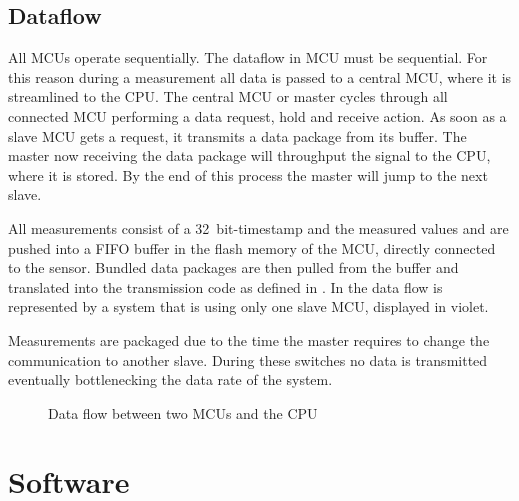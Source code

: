 



\subsection{Dataflow}

All \acs{MCU}s operate sequentially.
The dataflow in \ac{MCU} must be sequential. For this reason during a measurement all data is passed to a central \ac{MCU}, where it is streamlined to the \ac{CPU}. The central \ac{MCU} or master cycles through all connected \ac{MCU} performing a data request, hold and receive action. As soon as a slave \ac{MCU} gets a request, it transmits a data package from its buffer. The master now receiving the data package will throughput the signal to the \ac{CPU}, where it is stored. By the end of this process the master will jump to the next slave.

All measurements consist of a \SI{32}{bit}-timestamp and the measured values and are pushed into a \ac{FIFO} buffer in the flash memory of the \ac{MCU}, directly connected to the sensor. Bundled data packages are then pulled from the buffer and translated into the transmission code as defined in . In  the data flow is represented by a system that is using only one slave \ac{MCU}, displayed in violet.

Measurements are packaged due to the time the master requires to change the communication to another slave. During these switches no data is transmitted eventually bottlenecking the data rate of the system.

\begin{figure}[!htb]
    \centering
    
    \caption[Data flow]{Data flow between two \ac{MCU}s and the CPU}
    \label{fig:data_flow}
\end{figure}

\section{Software}

